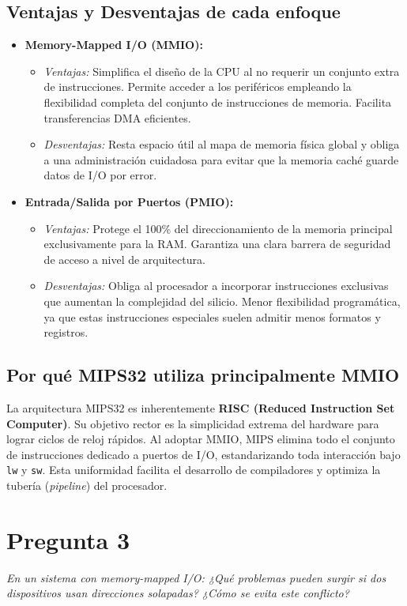 \documentclass[12pt,a4paper]{article}
\begin{document}
	\subsection{Ventajas y Desventajas de cada enfoque}
	\begin{itemize}
		\item \textbf{Memory-Mapped I/O (MMIO):}
		\begin{itemize}
			\item \textit{Ventajas:} Simplifica el diseño de la CPU al no requerir un conjunto extra de instrucciones. Permite acceder a los periféricos empleando la flexibilidad completa del conjunto de instrucciones de memoria. Facilita transferencias DMA eficientes.
			\item \textit{Desventajas:} Resta espacio útil al mapa de memoria física global y obliga a una administración cuidadosa para evitar que la memoria caché guarde datos de I/O por error.
		\end{itemize}
		\item \textbf{Entrada/Salida por Puertos (PMIO):}
		\begin{itemize}
			\item \textit{Ventajas:} Protege el 100\% del direccionamiento de la memoria principal exclusivamente para la RAM. Garantiza una clara barrera de seguridad de acceso a nivel de arquitectura.
			\item \textit{Desventajas:} Obliga al procesador a incorporar instrucciones exclusivas que aumentan la complejidad del silicio. Menor flexibilidad programática, ya que estas instrucciones especiales suelen admitir menos formatos y registros.
		\end{itemize}
	\end{itemize}
	
	\subsection{Por qué MIPS32 utiliza principalmente MMIO}
	La arquitectura MIPS32 es inherentemente \textbf{RISC (Reduced Instruction Set Computer)}. Su objetivo rector es la simplicidad extrema del hardware para lograr ciclos de reloj rápidos. Al adoptar MMIO, MIPS elimina todo el conjunto de instrucciones dedicado a puertos de I/O, estandarizando toda interacción bajo \texttt{lw} y \texttt{sw}. Esta uniformidad facilita el desarrollo de compiladores y optimiza la tubería (\textit{pipeline}) del procesador.
	
	\section{Pregunta 3}
	\textit{En un sistema con memory-mapped I/O: ¿Qué problemas pueden surgir si dos dispositivos usan direcciones solapadas? ¿Cómo se evita este conflicto?}
	
\end{document}
